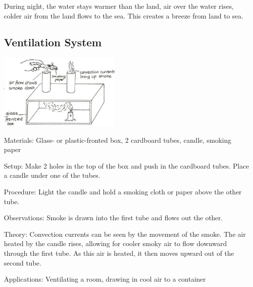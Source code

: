 \begin{multicols}{2}
\begin{description*}
{During night, the water stays warmer than the land, air over the water rises, colder air from the land flows to the sea. This creates a breeze from land to sea.}
\end{description*}

\columnbreak

\subsection{Ventilation System}

\begin{center}
\includegraphics[width=0.45\textwidth]{./img/vso/ventilation-system.jpg}
\end{center}

\begin{description*}
\item[Materials:]{Glass- or plastic-fronted box, 2 cardboard tubes, candle, smoking paper}
\item[Setup:]{Make 2 holes in the top of the box and push in the cardboard tubes. Place a candle under one of the tubes.}
\item[Procedure:]{Light the candle and hold a smoking cloth or paper above the other tube.}
\item[Observations:]{Smoke is drawn into the first tube and flows out the other.}
\item[Theory:]{Convection currents can be seen by the movement of the smoke. The air heated by the candle rises, allowing for cooler smoky air to flow downward through the first tube. As this air is heated, it then moves upward out of the second tube.}
\item[Applications:]{Ventilating a room, drawing in cool air to a container}
\end{description*}


\end{multicols}
